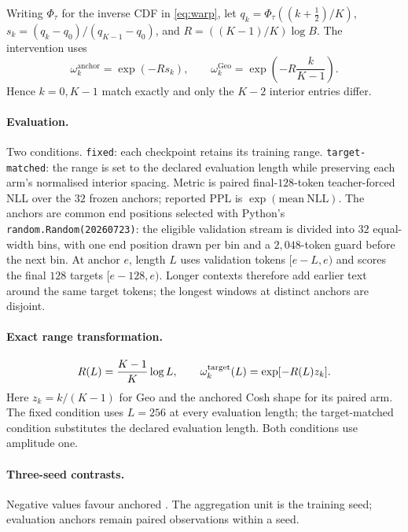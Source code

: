 Writing $\Phi_\tau$ for the inverse CDF in \eqref{eq:warp}, let
$q_k{=}\Phi_\tau((k+\tfrac12)/K)$,
$s_k{=}(q_k-q_0)/(q_{K-1}-q_0)$, and
$R{=}((K-1)/K)\log B$.  The intervention uses
\begin{equation}
\omega_k^{\mathrm{anchor}}=\exp(-R s_k),
\qquad
\omega_k^{\mathrm{Geo}}=\exp\!\left(-R\frac{k}{K-1}\right).
\label{eq:exact-range-grid}
\end{equation}
Hence $k{=}0,K{-}1$ match exactly and only the $K{-}2$ interior entries differ.

\paragraph{Evaluation.} Two conditions. \texttt{fixed}: each checkpoint retains
its training range. \texttt{target-matched}: the range is set to the declared
evaluation length while preserving each arm's normalised interior spacing.
Metric is paired final-$128$-token teacher-forced NLL over the $32$ frozen
anchors; reported PPL is $\exp(\mathrm{mean\ NLL})$.
The anchors are common end positions selected with Python's
\texttt{random.Random(20260723)}: the eligible validation stream is divided
into $32$ equal-width bins, with one end position drawn per bin and a
$2{,}048$-token guard before the next bin. At anchor $e$, length $L$ uses
validation tokens $[e-L,e)$ and scores the final $128$ targets $[e-128,e)$.
Longer contexts therefore add earlier text around the same target tokens;
the longest windows at distinct anchors are disjoint.

\paragraph{Exact range transformation.}
\[
R(L)=\frac{K-1}{K}\log L,\qquad
\omega_k^{\rm target}(L)=\exp[-R(L)z_k].
\]
Here $z_k=k/(K-1)$ for Geo and the anchored Cosh shape for its paired
arm. The fixed condition uses $L=256$ at every evaluation length;
the target-matched condition substitutes the declared evaluation length.
Both conditions use amplitude one.

\paragraph{Three-seed contrasts.}
Negative values favour anchored \evq{}. The aggregation unit is the training seed;
evaluation anchors remain paired observations within a seed.


